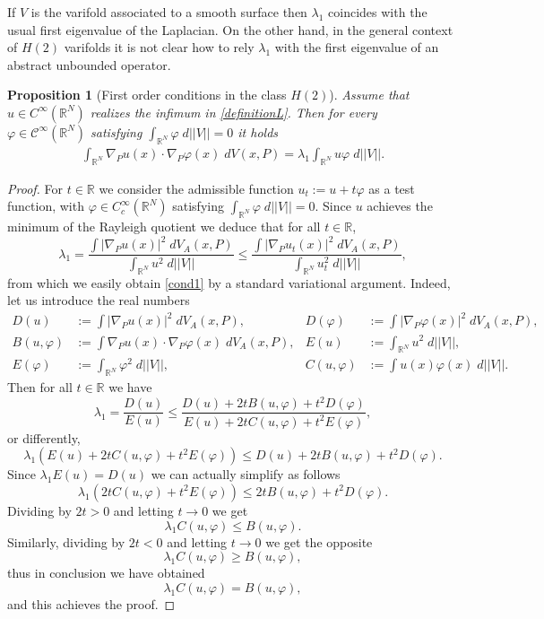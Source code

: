 \documentclass[12pt,english]{smfart} %
\newtheorem{proposition}[theorem]{Proposition}
\theoremstyle{remark}
\newcommand{\R}{\mathbb{R}}
\newcommand{\Cc}{\mathcal{C}}
\begin{document}
If $V$ is the varifold associated to a smooth surface then $\lambda_1$ coincides with the usual first eigenvalue of the Laplacian. On the other hand, in the general context of $H(2)$ varifolds it is not clear  how to  rely  $\lambda_1$ with the first eigenvalue of an abstract unbounded operator. 

 \medskip\begin{proposition}[First order conditions in the class $H(2)$] \label{firstorder} Assume that $u \in C^\infty(\R^N)$ realizes the infimum in \eqref{definitionL}. Then for every $\varphi \in \Cc^{\infty}(\R^N)$ satisfying $\int_{\R^N} \varphi \; d||V||=0$ it holds
 \begin{eqnarray}
\int_{\R^N} \nabla_P u(x) \cdot \nabla_P \varphi(x) \;d V(x,P) = \lambda_1 \int_{\R^N } u \varphi \;d||V||. \label{cond1}
 \end{eqnarray}
 \end{proposition}
 
\begin{proof}  For $t\in \R$ we consider the admissible function    $u_t:=u+t\varphi$ as a test function, with $\varphi \in C^\infty_c(\R^N)$ satisfying $\int_{\R^N} \varphi \; d||V||=0$.   Since $u$ achieves the minimum of the Rayleigh quotient  we deduce that for all $t\in \R$, 
$$  \lambda_1=\frac{\int |\nabla_P u(x)|^2 \;d V_A(x,P)}{\int_{\mathbb{R}^N} u^2\;d||V||} \leqslant   \frac{\int |\nabla_P u_t(x)|^2 \;d V_A(x,P)}{\int_{\mathbb{R}^N} u_t^2\;d||V||}, $$
from which we easily obtain \eqref{cond1} by a standard variational argument. Indeed, let us introduce the real numbers
\begin{align*}
    D(u)&:=\int |\nabla_P u(x)|^2 \;d V_A(x,P),   &D(\varphi)&:=\int |\nabla_P \varphi(x)|^2 \;d V_A(x,P),\\ B(u,\varphi)&:=\int \nabla_P u(x) \cdot \nabla_P \varphi(x) \;d V_A(x,P), &E(u)&:= \int_{\mathbb{R}^N} u^2\;d||V||,\\ E(\varphi) &:=\int_{\mathbb{R}^N} \varphi^2\;d||V||, &C(u,\varphi)&:=\int u(x)\varphi(x) \;d||V||.
\end{align*}
Then for all $t\in \R$ we have
$$\lambda_1=\frac{D(u)}{E(u)}\leqslant \frac{D(u)+2tB(u,\varphi)+t^2 D(\varphi)}{E(u) +2 t C(u,\varphi) + t^2 E(\varphi)},$$
or differently,
$$\lambda_1(E(u) +2 t C(u,\varphi) + t^2 E(\varphi))\leqslant D(u)+2tB(u,\varphi)+t^2 D(\varphi).$$
Since $\lambda_1E(u)=D(u)$ we can actually simplify as follows 
$$\lambda_1(2 t C(u,\varphi) + t^2 E(\varphi))\leqslant 2tB(u,\varphi)+t^2 D(\varphi).$$
Dividing by $2t>0$ and letting $t\to 0$ we get 
$$\lambda_1 C(u,\varphi) \leqslant B(u,\varphi).$$
Similarly, dividing by $2t<0$ and letting $t\to 0$ we get the opposite 
$$\lambda_1 C(u,\varphi) \geqslant B(u,\varphi),$$
thus in conclusion we have obtained 
$$\lambda_1 C(u,\varphi)  =B(u,\varphi),$$
and this achieves the proof.
\end{proof}
\end{document}
